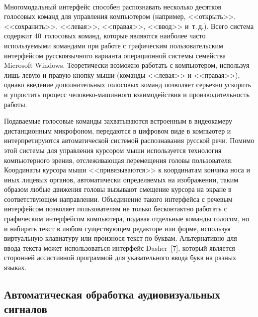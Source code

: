 \begin{multicols}{2}
\begin{figure*} %
 \vspace*{1pt}
 \begin{center}
 \mbox{%
 \epsfxsize=161.784mm
 }
 \end{center}
 \vspace*{-9pt}
\end{figure*}

  Многомодальный интерфейс способен распознавать несколько десятков 
голосовых команд для управления компьютером (например, <<открыть>>, 
<<сохранить>>, <<левая>>, <<правая>>, <<ввод>> и~т.\,д.). Всего система 
содержит 40~голосовых команд, которые являются наиболее часто 
используемыми командами при работе с графическим пользовательским 
интерфейсом русскоязычного варианта операционной системы семейства 
Microsoft Windows. Теоретически возможно работать с компьютером, 
используя лишь левую и правую кнопку мыши (команды <<левая>> и 
<<правая>>), однако введение дополнительных голосовых команд позволяет 
серьезно ускорить и упростить процесс человеко-машинного взаимодействия и 
производительность работы.
  
  Подаваемые голосовые команды захватываются встроенным в видеокамеру 
дистанционным микрофоном, передаются в цифровом виде в компьютер и 
интерпретируются автоматической системой распознавания русской речи. 
Помимо этой системы для управления курсором мыши используется 
технология компьютерного зрения, от\-сле\-жи\-ва\-ющая перемещения головы 
пользователя. Координаты курсора мыши <<привязываются>> к координатам 
кончика носа и иных лицевых органов, автоматически определяемых на 
изображении, таким образом любые движения головы вызывают смещение 
курсора на экране в соответствующем направлении. Объединение такого 
интерфейса с речевым интерфейсом позволяет пользователям не только 
бесконтактно работать с графическим интерфейсом компьютера, подавая 
отдельные команды голосом, но и набирать текст в любом существующем 
редакторе или форме, используя виртуальную клавиатуру или произнося текст 
по буквам. Альтернативно для ввода текста может использоваться интерфейс 
Dasher~[7], который является сторонней ассистивной программой для 
указательного ввода букв на разных языках.
  
\subsection{Автоматическая обработка аудиовизуальных сигналов}
  

\end{multicols}
